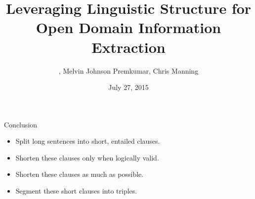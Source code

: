 \documentclass[hyperref,xcolor=table]{beamer}
\title{Leveraging Linguistic Structure for Open Domain Information Extraction}
\subtitle{}
\author{\darkblue{Gabor Angeli}, Melvin Johnson Premkumar, Chris Manning}
\date{July 27, 2015}
\institute[Stanford]{Stanford University}
\begin{document}
\begin{frame}[noframenumbering]
  \titlepage
\end{frame}






\def\title{Conclusion}
\begin{frame}{\title}
\begin{itemize}
  \item[\checkmark] Split long sentences into short, entailed clauses.
\end{itemize}
\vspace{0.5em}

\begin{itemize}
  \item[\checkmark] Shorten these clauses only when logically valid.
\end{itemize}
\vspace{0.5em}

\begin{itemize}
  \item[\checkmark] Shorten these clauses as much as possible.
\end{itemize}
\vspace{0.5em}

\begin{itemize}
  \item[\checkmark] Segment these short clauses into triples.
\end{itemize}

\begin{center}
\end{center}
\end{frame}
\end{document}

